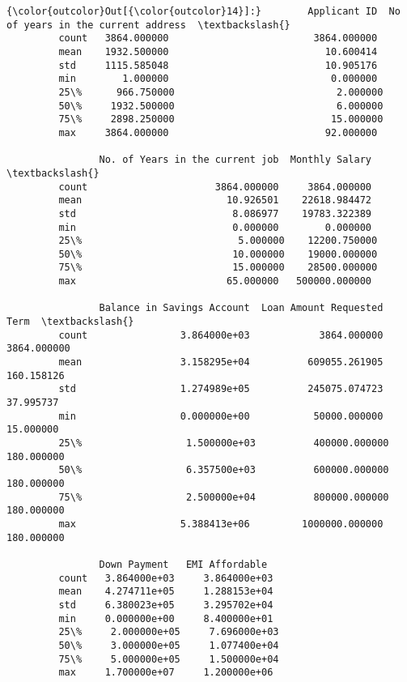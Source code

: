 \documentclass[11pt]{article}
\begin{document}
\begin{Verbatim}[commandchars=\\\{\}]
{\color{outcolor}Out[{\color{outcolor}14}]:}        Applicant ID  No of years in the current address  \textbackslash{}
         count   3864.000000                         3864.000000   
         mean    1932.500000                           10.600414   
         std     1115.585048                           10.905176   
         min        1.000000                            0.000000   
         25\%      966.750000                            2.000000   
         50\%     1932.500000                            6.000000   
         75\%     2898.250000                           15.000000   
         max     3864.000000                           92.000000   
         
                No. of Years in the current job  Monthly Salary  \textbackslash{}
         count                      3864.000000     3864.000000   
         mean                         10.926501    22618.984472   
         std                           8.086977    19783.322389   
         min                           0.000000        0.000000   
         25\%                           5.000000    12200.750000   
         50\%                          10.000000    19000.000000   
         75\%                          15.000000    28500.000000   
         max                          65.000000   500000.000000   
         
                Balance in Savings Account  Loan Amount Requested         Term  \textbackslash{}
         count                3.864000e+03            3864.000000  3864.000000   
         mean                 3.158295e+04          609055.261905   160.158126   
         std                  1.274989e+05          245075.074723    37.995737   
         min                  0.000000e+00           50000.000000    15.000000   
         25\%                  1.500000e+03          400000.000000   180.000000   
         50\%                  6.357500e+03          600000.000000   180.000000   
         75\%                  2.500000e+04          800000.000000   180.000000   
         max                  5.388413e+06         1000000.000000   180.000000   
         
                Down Payment   EMI Affordable   
         count   3.864000e+03     3.864000e+03  
         mean    4.274711e+05     1.288153e+04  
         std     6.380023e+05     3.295702e+04  
         min     0.000000e+00     8.400000e+01  
         25\%     2.000000e+05     7.696000e+03  
         50\%     3.000000e+05     1.077400e+04  
         75\%     5.000000e+05     1.500000e+04  
         max     1.700000e+07     1.200000e+06  
\end{Verbatim}
            
\end{document}
